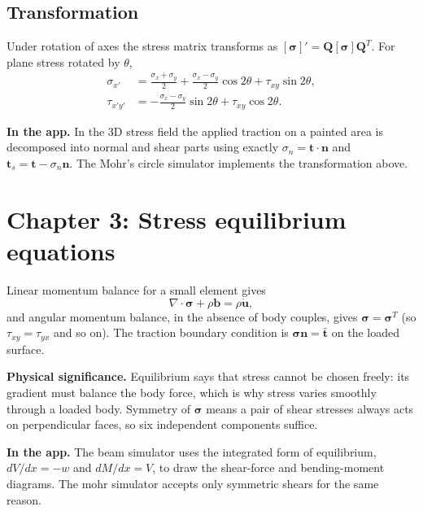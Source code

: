 \documentclass[11pt,a4paper]{article}
\newcommand{\tens}[1]{\bm{#1}}
\newcommand{\app}[1]{\par\smallskip\noindent\textbf{In the app.} #1}
\newcommand{\sig}[1]{\par\smallskip\noindent\textbf{Physical significance.} #1}
\begin{document}
\subsection{Transformation}
Under rotation of axes the stress matrix transforms as $[\tens{\sigma}]'=\tens{Q}[\tens{\sigma}]\tens{Q}^T$. For plane stress rotated by $\theta$,
\begin{align}
\sigma_{x'} &= \tfrac{\sigma_x+\sigma_y}{2}+\tfrac{\sigma_x-\sigma_y}{2}\cos2\theta+\tau_{xy}\sin2\theta,\\
\tau_{x'y'} &= -\tfrac{\sigma_x-\sigma_y}{2}\sin2\theta+\tau_{xy}\cos2\theta .
\end{align}
\app{In the 3D stress field the applied traction on a painted area is decomposed into normal and shear parts using exactly $\sigma_n=\tens{t}\cdot\tens{n}$ and $\tens{t}_s=\tens{t}-\sigma_n\tens{n}$. The Mohr's circle simulator implements the transformation above.}

\section{Chapter 3: Stress equilibrium equations}
Linear momentum balance for a small element gives
\begin{equation}
\nabla\cdot\tens{\sigma}+\rho\tens{b}=\rho\ddot{\tens{u}},
\end{equation}
and angular momentum balance, in the absence of body couples, gives $\tens{\sigma}=\tens{\sigma}^T$ (so $\tau_{xy}=\tau_{yx}$ and so on). The traction boundary condition is $\tens{\sigma}\tens{n}=\bar{\tens{t}}$ on the loaded surface.

\sig{Equilibrium says that stress cannot be chosen freely: its gradient must balance the body force, which is why stress varies smoothly through a loaded body. Symmetry of $\tens{\sigma}$ means a pair of shear stresses always acts on perpendicular faces, so six independent components suffice.}
\app{The beam simulator uses the integrated form of equilibrium, $dV/dx=-w$ and $dM/dx=V$, to draw the shear-force and bending-moment diagrams. The mohr simulator accepts only symmetric shears for the same reason.}
\end{document}
